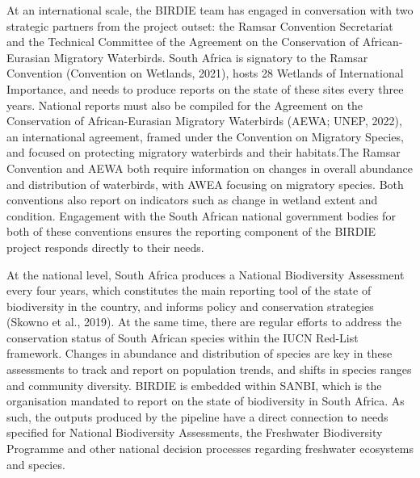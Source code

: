 \documentclass[utf8]{frontiersSCNS}
\begin{document}
At an international scale, the BIRDIE team has engaged in conversation
with two strategic partners from the project outset: the Ramsar
Convention Secretariat and the Technical Committee of the Agreement on
the Conservation of African-Eurasian Migratory Waterbirds. South Africa
is signatory to the Ramsar Convention (Convention on Wetlands, 2021),
hosts 28 Wetlands of International Importance, and needs to produce
reports on the state of these sites every three years. National reports
must also be compiled for the Agreement on the Conservation of
African-Eurasian Migratory Waterbirds (AEWA; UNEP, 2022), an
international agreement, framed under the Convention on Migratory
Species, and focused on protecting migratory waterbirds and their
habitats.The Ramsar Convention and AEWA both require information on
changes in overall abundance and distribution of waterbirds, with AWEA
focusing on migratory species. Both conventions also report on
indicators such as change in wetland extent and condition. Engagement
with the South African national government bodies for both of these
conventions ensures the reporting component of the BIRDIE project
responds directly to their needs.

At the national level, South Africa produces a National Biodiversity
Assessment every four years, which constitutes the main reporting tool
of the state of biodiversity in the country, and informs policy and
conservation strategies (Skowno et al., 2019). At the same time, there
are regular efforts to address the conservation status of South African
species within the IUCN Red-List framework. Changes in abundance and
distribution of species are key in these assessments to track and report
on population trends, and shifts in species ranges and community
diversity. BIRDIE is embedded within SANBI, which is the organisation
mandated to report on the state of biodiversity in South Africa. As
such, the outputs produced by the pipeline have a direct connection to
needs specified for National Biodiversity Assessments, the Freshwater
Biodiversity Programme and other national decision processes regarding
freshwater ecosystems and species.
\end{document}
